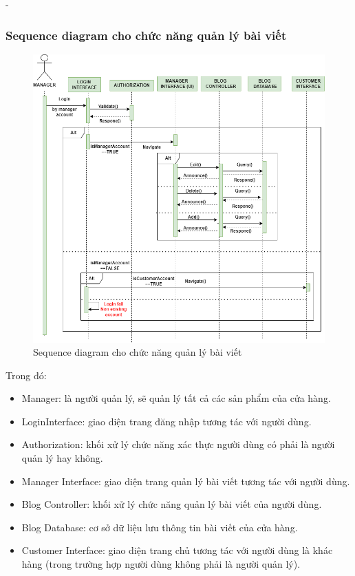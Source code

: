 \begin {list} {-}{}
\subsubsection{Sequence diagram cho chức năng quản lý bài viết}
\begin{figure}[H]
    \centering
    \includegraphics[scale=0.5]{images/hieu/chap-3/manage-blog-sequence-diagram.png}
    \caption{Sequence diagram cho chức năng quản lý bài viết}
\end{figure}
Trong đó:
\begin{itemize}
    \item Manager: là người quản lý, sẽ quản lý tất cả các sản phẩm của cửa hàng.
    \item LoginInterface: giao diện trang đăng nhập tương tác với người dùng.
    \item Authorization: khối xử lý chức năng xác thực người dùng có phải là người quản lý hay không.
    \item Manager Interface: giao diện trang quản lý bài viết tương tác với người dùng.
    \item Blog Controller: khối xử lý chức năng quản lý bài viết của người dùng.
    \item Blog Database: cơ sở dữ liệu lưu thông tin bài viết của cửa hàng.
    \item Customer Interface: giao diện trang chủ tương tác với người dùng là khác hàng (trong trường hợp người dùng không phải là người quản lý).
\end{itemize}
\newpage

\end{list}
